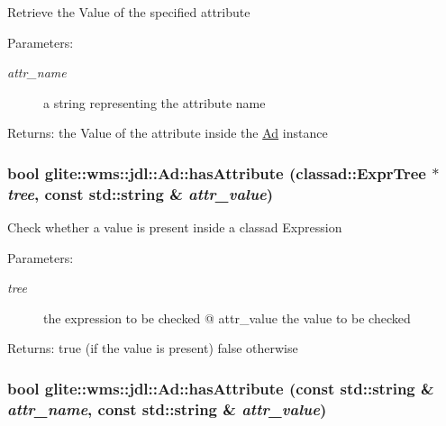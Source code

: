 Retrieve the Value of the specified attribute \begin{Desc}
\item[Parameters:]
\begin{description}
\item[{\em attr\_\-name}]a string representing the attribute name \end{description}
\end{Desc}
\begin{Desc}
\item[Returns:]the Value of the attribute inside the \hyperlink{classglite_1_1wms_1_1jdl_1_1Ad}{Ad} instance\end{Desc}
\hypertarget{classglite_1_1wms_1_1jdl_1_1Ad_b5}{
\subsubsection[hasAttribute]{\setlength{\rightskip}{0pt plus 5cm}bool glite::wms::jdl::Ad::has\-Attribute (classad::Expr\-Tree $\ast$ {\em tree}, const std::string \& {\em attr\_\-value})}}
\label{classglite_1_1wms_1_1jdl_1_1Ad_b5}


Check whether a value is present inside a classad Expression \begin{Desc}
\item[Parameters:]
\begin{description}
\item[{\em tree}]the expression to be checked @ attr\_\-value the value to be checked \end{description}
\end{Desc}
\begin{Desc}
\item[Returns:]true (if the value is present) false otherwise \end{Desc}
\hypertarget{classglite_1_1wms_1_1jdl_1_1Ad_z17_2}{
\subsubsection[hasAttribute]{\setlength{\rightskip}{0pt plus 5cm}bool glite::wms::jdl::Ad::has\-Attribute (const std::string \& {\em attr\_\-name}, const std::string \& {\em attr\_\-value})}}
\label{classglite_1_1wms_1_1jdl_1_1Ad_z17_2}


